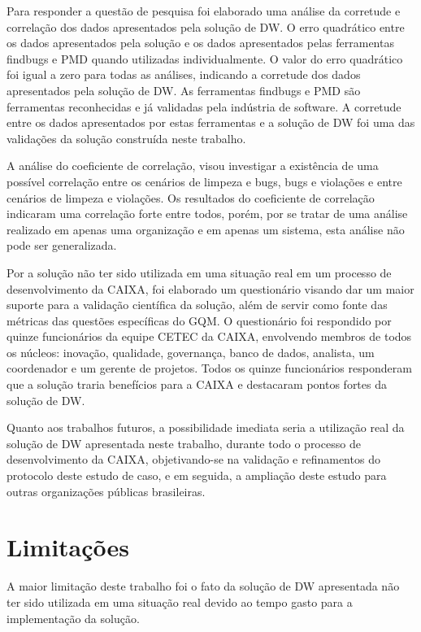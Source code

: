 Para responder a questão de pesquisa foi elaborado uma análise da corretude e correlação dos dados apresentados pela solução de DW. O erro quadrático entre os dados apresentados pela solução e os dados apresentados pelas ferramentas findbugs e PMD quando utilizadas individualmente. O valor do erro quadrático foi igual a zero para todas as análises, indicando a corretude dos dados apresentados pela solução de DW. As ferramentas findbugs e PMD são ferramentas reconhecidas e já validadas pela indústria de software. A corretude entre os dados apresentados por estas ferramentas e a solução de DW foi uma das validações da solução construída neste trabalho.

A análise do coeficiente de correlação, visou investigar a existência de uma possível correlação entre os cenários de limpeza e bugs, bugs e violações e entre cenários de limpeza e violações. Os resultados do coeficiente de correlação indicaram uma correlação forte entre todos, porém, por se tratar de uma análise realizado em apenas uma organização e em apenas um sistema, esta análise não pode ser generalizada.

Por a solução não ter sido utilizada em uma situação real em um processo de desenvolvimento da CAIXA, foi elaborado um questionário visando dar um maior suporte para a validação científica da solução, além de servir como fonte das métricas das questões específicas do GQM. O questionário foi respondido por quinze funcionários da equipe CETEC da CAIXA, envolvendo membros de todos os núcleos: inovação, qualidade, governança, banco de dados, analista, um coordenador e um gerente de projetos. Todos os quinze funcionários responderam que a solução traria benefícios para a CAIXA e destacaram pontos fortes da solução de DW.  

Quanto aos trabalhos futuros, a possibilidade imediata seria a utilização real da solução de DW apresentada neste trabalho, durante todo o processo de desenvolvimento da CAIXA, objetivando-se na validação e refinamentos do protocolo deste estudo de caso, e em seguida, a ampliação deste estudo para outras organizações públicas brasileiras.  

\section{Limitações}

A maior limitação deste trabalho foi o fato da solução de DW apresentada não ter sido utilizada em uma situação real devido ao tempo gasto para a implementação da solução. 

